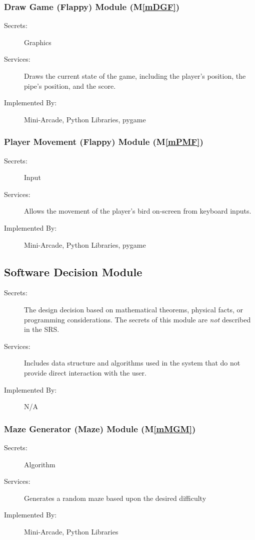 \documentclass[12pt, titlepage]{article}
\newcommand{\mref}[1]{M\ref{#1}}
\begin{document}
\subsubsection{Draw Game (Flappy) Module (\mref{mDGF})}
\begin{description}
\item[Secrets:] Graphics
\item[Services:] Draws the current state of the game, including the player's position, the pipe's position, and the score.
\item[Implemented By:] Mini-Arcade, Python Libraries, pygame
\end{description}

\subsubsection{Player Movement (Flappy) Module (\mref{mPMF})}
\begin{description}
\item[Secrets:] Input
\item[Services:] Allows the movement of the player's bird on-screen from keyboard inputs.
\item[Implemented By:] Mini-Arcade, Python Libraries, pygame
\end{description}



\subsection{Software Decision Module}

\begin{description}
\item[Secrets:] The design decision based on mathematical theorems, physical
  facts, or programming considerations. The secrets of this module are
  \emph{not} described in the SRS.
\item[Services:] Includes data structure and algorithms used in the system that
  do not provide direct interaction with the user. 
\item[Implemented By:] N/A
\end{description}

\subsubsection{Maze Generator (Maze) Module (\mref{mMGM})}
\begin{description}
\item[Secrets:] Algorithm
\item[Services:] Generates a random maze based upon the desired difficulty 
\item[Implemented By:] Mini-Arcade, Python Libraries
\end{description}
\end{document}
